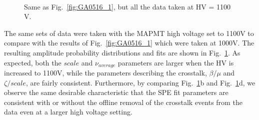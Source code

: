 \begin{figure}[hb] 
\centering 
  \hfill
   \\
  \hfill
  \caption{Same as Fig.~\ref{fig:GA0516_1}, but all the data taken at HV = 1100 V. 
    }
\label{fig:GA0516_2}
\end{figure}

The same sets of data were taken with the MAPMT high voltage set to 1100V to compare with the results of Fig.~\ref{fig:GA0516_1} which were taken at 1000V. 
The resulting amplitude probability distributions and fits are shown in Fig.~\ref{fig:GA0516_2}. 
As expected, both the $scale$ and $\nu_{average}$ parameters are larger when the HV is increased to 1100V, while the parameters describing the crosstalk, $\beta/\mu$ and $\zeta/scale$, are fairly consistent. 
Furthermore, by comparing Fig.~\ref{fig:GA0516_2}b and Fig.~\ref{fig:GA0516_2}d, we observe the same desirable characteristic that the SPE fit parameters are consistent with or without the offline removal of the crosstalk events from the data even at a larger high voltage setting.

